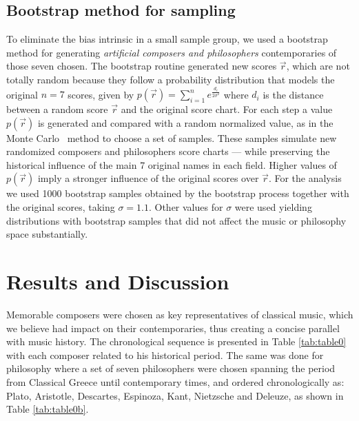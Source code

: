 \documentclass[
 aip,
 jmp,
 amsmath,amssymb,
 reprint,
]{revtex4-1}
\begin{document}
\subsection{Bootstrap method for sampling}
\label{bootstrap}

To eliminate the bias intrinsic in a small sample group, we used a
bootstrap method for generating \emph{artificial composers and
  philosophers} contemporaries of those seven chosen. The bootstrap
routine generated new scores $\vec{r}$, which are not totally random
because they follow a probability distribution that models the
original $n = 7$ scores, given by $p(\vec{r}) = \sum^n_{i=1}
e^{\frac{d_i}{2\sigma^2}}$ where $d_i$ is the distance between a
random score $\vec{r}$ and the original score chart. For each step a
value $p(\vec{r})$ is generated and compared with a random normalized
value, as in the Monte Carlo~\cite{Robert2011} method to choose a set
of samples. These samples simulate new randomized composers and
philosophers score charts --- while preserving the historical
influence of the main 7 original names in each field. Higher values of
$p(\vec{r})$ imply a stronger influence of the original scores over
$\vec{r}$. For the analysis we used 1000 bootstrap samples obtained by
the bootstrap process together with the original scores, taking
$\sigma = 1.1$. Other values for $\sigma$ were used yielding
distributions with bootstrap samples that did not affect the music or
philosophy space substantially.

\section{Results and Discussion}

Memorable composers were chosen as key representatives of classical
music, which we believe had impact on their contemporaries, thus
creating a concise parallel with music history. The chronological
sequence is presented in Table \ref{tab:table0} with each composer
related to his historical period. The same was done for philosophy
where a set of seven philosophers were chosen spanning the period from
Classical Greece until contemporary times, and ordered chronologically
as: Plato, Aristotle, Descartes, Espinoza, Kant, Nietzsche and
Deleuze, as shown in Table \ref{tab:table0b}.
\end{document}
